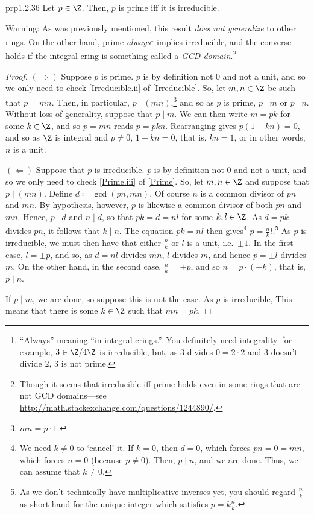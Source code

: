 \begin{prp}{}{prp1.2.36}
Let $p\in \Z$.  Then, $p$ is prime iff it is irreducible.
\begin{wrn}
Warning:  As was previously mentioned, this result \emph{does not generalize} to other rings.  On the other hand, prime \emph{always}\footnote{``Always'' meaning ``in integral crings.''.  You definitely need integrality--for example, $3\in \Z /4\Z$ is irreducible, but, as $3$ divides $0=2\cdot 2$ and $3$ doesn't divide $2$, $3$ is not prime.} implies irreducible, and the converse holds if the integral cring is something called a \emph{GCD domain}.\footnote{Though it seems that irreducible iff prime holds even in some rings that are not GCD domains---see \url{http://math.stackexchange.com/questions/1244890/}.}
\end{wrn}
\begin{proof}
$(\Rightarrow )$ Suppose $p$ is prime.  $p$ is by definition not $0$ and not a unit, and so we only need to check \cref{Irreducible.ii} of \cref{Irreducible}.  So, let $m,n\in \Z$ be such that $p=mn$.  Then, in particular, $p\mid (mn)$,\footnote{$mn=p\cdot 1$.} and so as $p$ is prime, $p\mid m$ or $p\mid n$.  Without loss of generality, suppose that $p\mid m$.  We can then write $m=pk$ for some $k\in \Z$, and so $p=mn$ reads $p=pkn$.  Rearranging gives $p(1-kn)=0$, and so as $\Z$ is integral and $p\neq 0$, $1-kn=0$, that is, $kn=1$, or in other words, $n$ is a unit.

\blankline
\noindent
$(\Leftarrow )$ Suppose that $p$ is irreducible.  $p$ is by definition not $0$ and not a unit, and so we only need to check \cref{Prime.iii} of \cref{Prime}.  So, let $m,n\in \Z$ and suppose that $p\mid (mn)$.  Define $d\coloneqq \gcd (pn,mn)$.  Of course $n$ is a common divisor of $pn$ and $mn$.  By hypothesis, however, $p$ is likewise a common divisor of both $pn$ and $mn$.  Hence, $p\mid d$ and $n\mid d$, so that $pk=d=nl$ for some $k,l\in \Z$.  As $d=pk$ divides $pn$, it follows that $k\mid n$.  The equation $pk=nl$ then gives\footnote{We need $k\neq 0$ to `cancel' it.  If $k=0$, then $d=0$, which forces $pn=0=mn$, which forces $n=0$ (because $p\neq 0$).  Then, $p\mid n$, and we are done.  Thus, we can assume that $k\neq 0$.} $p=\frac{n}{k}l$.\footnote{As we don't technically have multiplicative inverses yet, you should regard $\frac{n}{k}$ as short-hand for the unique integer which satisfies $p=k\frac{n}{k}$.}  As $p$ is irreducible, we must then have that either $\frac{n}{k}$ or $l$ is a unit, i.e.~$\pm 1$.  In the first case, $l=\pm p$, and so, as $d=nl$ divides $mn$, $l$ divides $m$, and hence $p=\pm l$ divides $m$.  On the other hand, in the second case, $\frac{n}{k}=\pm p$, and so $n=p\cdot (\pm k)$, that is, $p\mid n$.

If $p\mid m$, we are done, so suppose this is not the case.  As $p$ is irreducible, This means that there is some $k\in \Z$ such that $mn=pk$.
\end{proof}
\end{prp}

